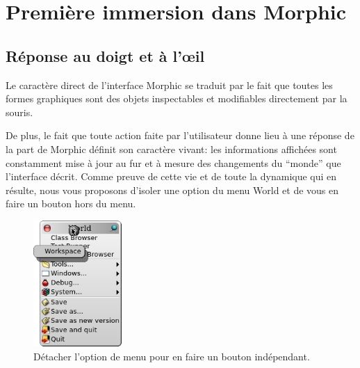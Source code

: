 \documentclass[a4paper,10pt,twoside]{book}
\begin{document}
\section{Première immersion dans Morphic}

\subsection{Réponse au doigt et à l'\oe il}
Le caractère direct de l'interface Morphic se traduit par le fait
que toutes les formes graphiques sont des objets 
inspectables et modifiables directement par la souris.

De plus, le fait que toute action faite par l'utilisateur donne lieu
à une réponse de la part de Morphic définit son caractère
vivant: les informations affichées sont constamment mise à jour
au fur et à mesure des changements du ``monde'' que l'interface
décrit. 
Comme preuve de cette vie et de toute la dynamique qui en résulte,
nous vous proposons d'isoler une option du menu World et de vous
en faire un bouton hors du menu.


\begin{figure}[ht]
   \centerline{\includegraphics[width=0.3\textwidth]{detachingMenu}}
	\caption{Détacher l'option de menu  pour
      en faire un bouton indépendant.}
\end{figure}
\end{document}
